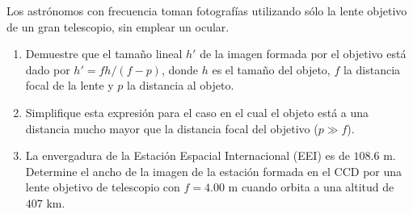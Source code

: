 \item Los astrónomos con frecuencia toman fotografías utilizando sólo la lente objetivo de un gran telescopio, sin emplear un ocular.
\begin{enumerate}
    \item Demuestre que el tamaño lineal $h'$ de la imagen formada por el objetivo está dado por $h' = f h / (f - p)$, donde $h$ es el tamaño del objeto, $f$ la distancia focal de la lente y $p$ la distancia al objeto.
    \item Simplifique esta expresión para el caso en el cual el objeto está a una distancia mucho mayor que la distancia focal del objetivo ($p \gg f$).
    \item La envergadura de la Estación Espacial Internacional (EEI) es de $108.6\text{ m}$. Determine el ancho de la imagen de la estación formada en el CCD por una lente objetivo de telescopio con $f = 4.00\text{ m}$ cuando orbita a una altitud de $407\text{ km}$.
\end{enumerate}